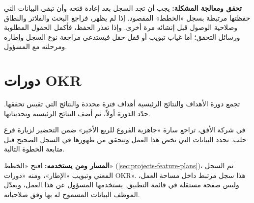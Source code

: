 \textbf{تحقق ومعالجة المشكلة:} يجب أن تجد السجل بعد إعادة فتحه وأن تبقى البيانات التي حفظتها مرتبطة بسجل «الخطط» المقصود. إذا لم يظهر، فراجع البحث والفلاتر والنطاق وصلاحية الوصول قبل إنشائه مرة أخرى. وإذا تعذر الحفظ، فأكمل الحقول المطلوبة ورسائل التحقق؛ أما غياب تبويب أو قفل حقل فيستدعي مراجعة نوع السجل وإطاره ومرحلته مع المسؤول.

\clearpage
\section{دورات OKR}
\label{sec:projects-feature-planning-okrs}

تجمع دورة الأهداف والنتائج الرئيسية أهداف فترة محددة والنتائج التي تقيس تحققها. حدّد الدورة أولاً، ثم أضف النتائج الرئيسية وتحديثاتها.

\begin{rcnote}
في شركة الأفق، تراجع سارة «جاهزية الفروع للربع الأخير» ضمن التحضير لزيارة فرع حلب. تحدد البيانات التي تخص هذا العمل وتتحقق من ظهورها في السجل الصحيح قبل متابعة الخطوة التالية.
\end{rcnote}

\textbf{المسار ومن يستخدمه:} افتح «الخطط» (\ref{sec:projects-feature-plans})، ثم السجل المعني وتبويب «الإطار»، ومنه «دورات OKR». هذا سجل مرتبط داخل مساحة العمل، وليس صفحة مستقلة في قائمة التطبيق. يستخدمها المسؤول عن هذا العمل، ويعدّل الموظف البيانات المسموح له بها وفق صلاحياته.

